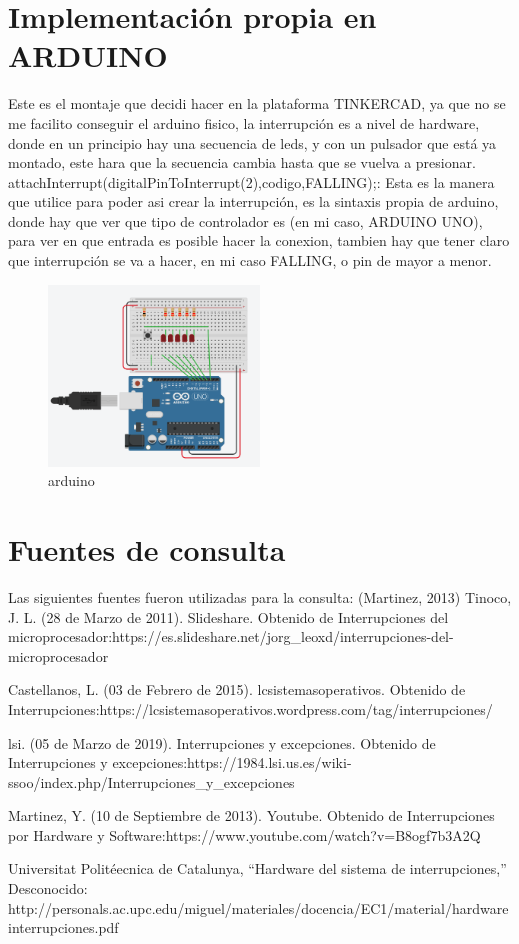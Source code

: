 \documentclass{article}
\begin{document}
\section{Implementación propia en ARDUINO}
Este es el montaje que decidi hacer en la plataforma TINKERCAD, ya que no se me facilito conseguir el arduino fisico, la interrupción es a nivel de hardware, donde en un principio hay una secuencia de leds, y con un pulsador que está ya montado, este hara que la secuencia cambia hasta que se vuelva a presionar.
attachInterrupt(digitalPinToInterrupt(2),codigo,FALLING);: Esta es la manera que utilice para poder asi crear la interrupción, es la sintaxis propia de arduino, donde hay que ver que tipo de controlador es (en mi caso, ARDUINO UNO), para ver en que entrada es posible hacer la conexion, tambien hay que tener claro que interrupción se va a hacer, en mi caso FALLING, o pin de mayor a menor.

\begin{figure}
\centering
\includegraphics[width=0.50\textwidth]{arduino.png}
\caption{\label{fig1}arduino}
\end{figure}

\section{Fuentes de consulta}

Las siguientes fuentes fueron utilizadas para la consulta:
(Martinez, 2013) Tinoco, J. L. (28 de Marzo de 2011). Slideshare. Obtenido de Interrupciones del microprocesador:https://es.slideshare.net/jorg_leoxd/interrupciones-del-microprocesador

Castellanos, L. (03 de Febrero de 2015). lcsistemasoperativos. Obtenido de Interrupciones:https://lcsistemasoperativos.wordpress.com/tag/interrupciones/

lsi. (05 de Marzo de 2019). Interrupciones y excepciones. Obtenido de Interrupciones y excepciones:https://1984.lsi.us.es/wiki-ssoo/index.php/Interrupciones_y_excepciones

Martinez, Y. (10 de Septiembre de 2013). Youtube. Obtenido de Interrupciones por Hardware y Software:https://www.youtube.com/watch?v=B8ogf7b3A2Q

Universitat Politéecnica de Catalunya, “Hardware del sistema de interrupciones,” Desconocido: http://personals.ac.upc.edu/miguel/materiales/docencia/EC1/material/hardware interrupciones.pdf
\end{document}
